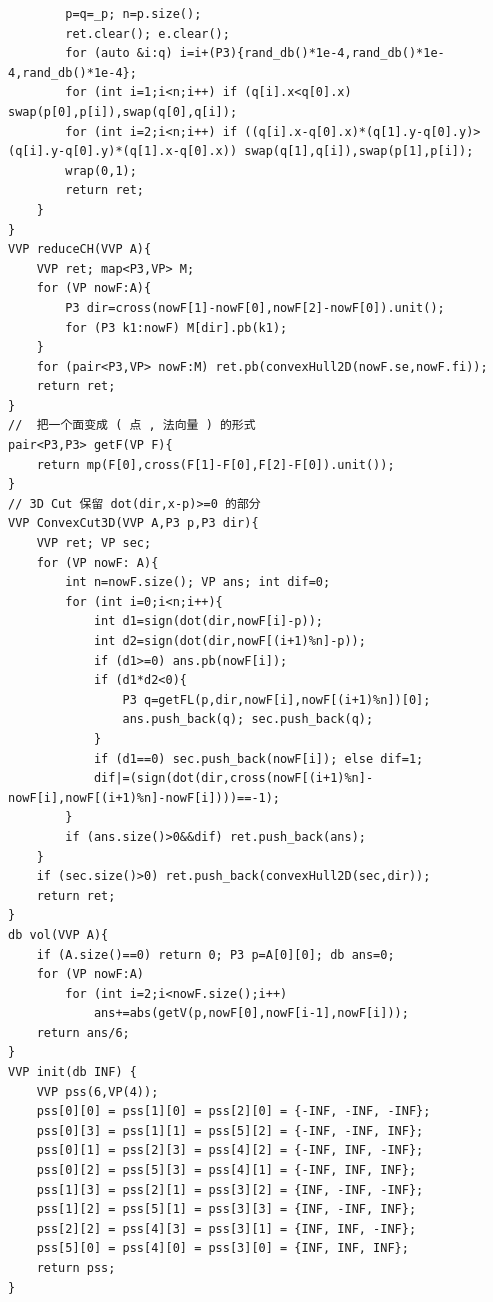 \documentclass[twoside]{article}
\begin{document}
\begin{lstlisting}
        p=q=_p; n=p.size();
        ret.clear(); e.clear();
        for (auto &i:q) i=i+(P3){rand_db()*1e-4,rand_db()*1e-4,rand_db()*1e-4};
        for (int i=1;i<n;i++) if (q[i].x<q[0].x) swap(p[0],p[i]),swap(q[0],q[i]);
        for (int i=2;i<n;i++) if ((q[i].x-q[0].x)*(q[1].y-q[0].y)>(q[i].y-q[0].y)*(q[1].x-q[0].x)) swap(q[1],q[i]),swap(p[1],p[i]);
        wrap(0,1);
        return ret;
    }
}
VVP reduceCH(VVP A){
    VVP ret; map<P3,VP> M;
    for (VP nowF:A){
        P3 dir=cross(nowF[1]-nowF[0],nowF[2]-nowF[0]).unit();
        for (P3 k1:nowF) M[dir].pb(k1);
    }
    for (pair<P3,VP> nowF:M) ret.pb(convexHull2D(nowF.se,nowF.fi));
    return ret;
}
//  把一个面变成 ( 点 , 法向量 ) 的形式
pair<P3,P3> getF(VP F){
    return mp(F[0],cross(F[1]-F[0],F[2]-F[0]).unit());
}
// 3D Cut 保留 dot(dir,x-p)>=0 的部分
VVP ConvexCut3D(VVP A,P3 p,P3 dir){
    VVP ret; VP sec;
    for (VP nowF: A){
        int n=nowF.size(); VP ans; int dif=0;
        for (int i=0;i<n;i++){
            int d1=sign(dot(dir,nowF[i]-p));
            int d2=sign(dot(dir,nowF[(i+1)%n]-p));
            if (d1>=0) ans.pb(nowF[i]);
            if (d1*d2<0){
                P3 q=getFL(p,dir,nowF[i],nowF[(i+1)%n])[0];
                ans.push_back(q); sec.push_back(q);
            }
            if (d1==0) sec.push_back(nowF[i]); else dif=1;
            dif|=(sign(dot(dir,cross(nowF[(i+1)%n]-nowF[i],nowF[(i+1)%n]-nowF[i])))==-1);
        }
        if (ans.size()>0&&dif) ret.push_back(ans);
    }
    if (sec.size()>0) ret.push_back(convexHull2D(sec,dir));
    return ret;
}
db vol(VVP A){
    if (A.size()==0) return 0; P3 p=A[0][0]; db ans=0;
    for (VP nowF:A)
        for (int i=2;i<nowF.size();i++)
            ans+=abs(getV(p,nowF[0],nowF[i-1],nowF[i]));
    return ans/6;
}
VVP init(db INF) {
    VVP pss(6,VP(4));
    pss[0][0] = pss[1][0] = pss[2][0] = {-INF, -INF, -INF};
    pss[0][3] = pss[1][1] = pss[5][2] = {-INF, -INF, INF};
    pss[0][1] = pss[2][3] = pss[4][2] = {-INF, INF, -INF};
    pss[0][2] = pss[5][3] = pss[4][1] = {-INF, INF, INF};
    pss[1][3] = pss[2][1] = pss[3][2] = {INF, -INF, -INF};
    pss[1][2] = pss[5][1] = pss[3][3] = {INF, -INF, INF};
    pss[2][2] = pss[4][3] = pss[3][1] = {INF, INF, -INF};
    pss[5][0] = pss[4][0] = pss[3][0] = {INF, INF, INF};
    return pss;
}
\end{lstlisting}
\end{document}
